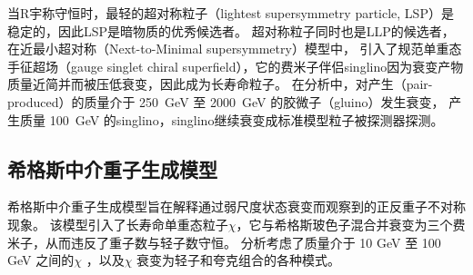 当R宇称守恒时，最轻的超对称粒子（lightest supersymmetry particle, LSP）是稳定的，因此LSP是暗物质的优秀候选者。
超对称粒子同时也是LLP的候选者，在近最小超对称（Next-to-Minimal supersymmetry）模型中，
引入了规范单重态手征超场（gauge singlet chiral superfield），它的费米子伴侣singlino因为衰变产物质量近简并而被压低衰变，因此成为长寿命粒子。
\cite{singlino}
在分析中，对产生（pair-produced）的质量介于 \SI{250}{GeV} 至 \SI{2000}{GeV} 的胶微子（gluino）发生衰变，
产生质量 \SI{100}{GeV} 的singlino，singlino继续衰变成标准模型粒子被探测器探测。


\subsection{希格斯中介重子生成模型}
希格斯中介重子生成模型旨在解释通过弱尺度状态衰变而观察到的正反重子不对称现象。
该模型引入了长寿命单重态粒子$\chi$，它与希格斯玻色子混合并衰变为三个费米子，从而违反了重子数与轻子数守恒。
分析考虑了质量介于 10 GeV 至 100 GeV 之间的$\chi$ ，以及$\chi$ 衰变为轻子和夸克组合的各种模式。

